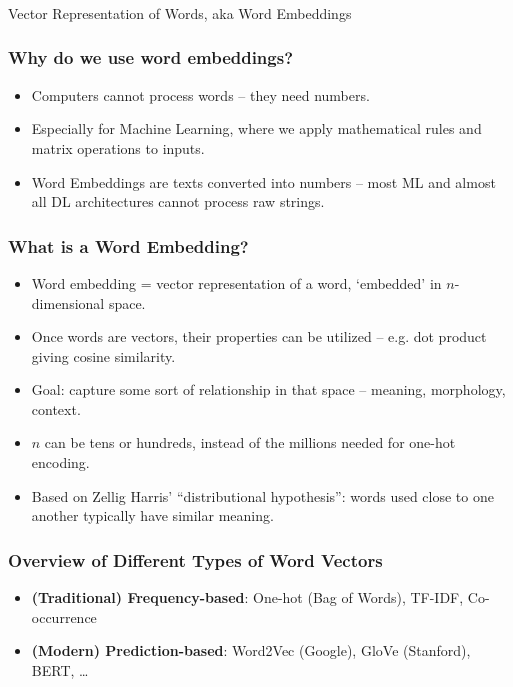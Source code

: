 \begin{frame}[fragile]\frametitle{}
\begin{center}
{\Large Vector Representation of Words, aka Word Embeddings}
\end{center}
\end{frame}

\begin{frame}[fragile]\frametitle{Why do we use word embeddings?}
	\begin{itemize}
	\item Computers cannot process words -- they need numbers.
	\item Especially for Machine Learning, where we apply mathematical rules and matrix operations to inputs.
	\item Word Embeddings are texts converted into numbers -- most ML and almost all DL architectures cannot process raw strings.
	\end{itemize}
\end{frame}

\begin{frame}[fragile]\frametitle{What is a Word Embedding?}
	\begin{itemize}
	\item Word embedding = vector representation of a word, `embedded' in $n$-dimensional space.
	\item Once words are vectors, their properties can be utilized -- e.g. dot product giving cosine similarity.
	\item Goal: capture some sort of relationship in that space -- meaning, morphology, context.
	\item $n$ can be tens or hundreds, instead of the millions needed for one-hot encoding.
	\item Based on Zellig Harris' ``distributional hypothesis'': words used close to one another typically have similar meaning.
	\end{itemize}
\end{frame}

\begin{frame}[fragile]\frametitle{Overview of Different Types of Word Vectors}
	\begin{itemize}
	\item \textbf{(Traditional) Frequency-based}: One-hot (Bag of Words), TF-IDF, Co-occurrence
	\item \textbf{(Modern) Prediction-based}: Word2Vec (Google), GloVe (Stanford), BERT, \ldots
	\end{itemize}
\end{frame}

